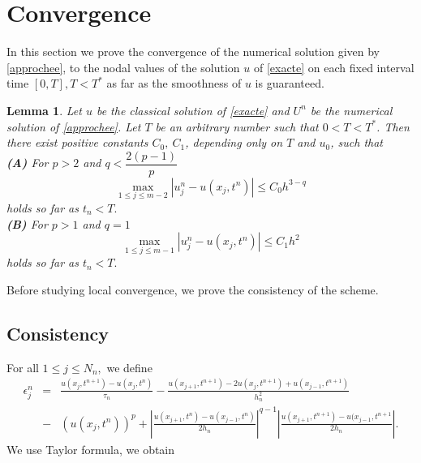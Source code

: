 \documentclass[a4paper,12pt,english,reqno]{smfart}
\newtheorem{lem}[th1]{ Lemma}
\begin{document}
	\section{Convergence }
	\noindent In this section we prove the convergence of the numerical solution given by \eqref{approchee}, to the nodal values of the solution $u$ of \eqref{exacte} on each fixed interval time $[0,T],T<T^{*}$ as far as the smoothness of $u$ is guaranteed.
	\begin{lem}
		Let $u$ be the classical solution of \eqref{exacte} and $U^{n}$ be the numerical solution of \eqref{approchee}. Let $T$ be an arbitrary number such that $0<T<T^{*}$. Then there exist positive constants $C_{0},\ C_{1}$, depending only on $T$ and $u_{0}$, such that\\
		\textbf{(A)} For $p>2$ and $q<\dfrac{2(p-1)}{p}$
		\begin{equation*}
		\max_{1\leq j \leq m-2}\left|u_{j}^{n}-u(x_{j},t^{n})\right|\leq C_{0}h^{3-q}
		\end{equation*} 
		holds so far as $t_{n}<T.$\\
		\textbf{(B)} For $p>1$ and $q=1$
		\begin{equation*}
		\max_{1\leq j \leq m-1}\left|u_{j}^{n}-u(x_{j},t^{n})\right|\leq C_{1}h^{2}
		\end{equation*} 
		holds so far as $t_{n}<T.$
	\end{lem}
	\noindent Before studying local convergence, we prove the consistency of the scheme.
	\subsection{Consistency}
	For all $1\leq j \leq N_{n},$ we define
	\begin{eqnarray*}
		\epsilon_{j}^{n}& =&\frac{u(x_{j},t^{n+1})-u(x_{j},t^{n})}{\tau_{n}}-\frac{u(x_{j+1},t^{n+1})-2u(x_{j},t^{n+1})+u(x_{j-1},t^{n+1})}{h_{n}^{2}} \\ &-&\left(u(x_{j},t^{n})\right)^{p}+\left|\frac{u(x_{j+1},t^{n})-u(x_{j-1},t^{n})}{2h_{n}}\right|^{q-1}\left|\frac{u(x_{j+1},t^{n+1})-u(x_{j-1},t^{n+1}}{2h_{n}}\right|.
	\end{eqnarray*}
	We use Taylor formula, we obtain
	
\end{document}
